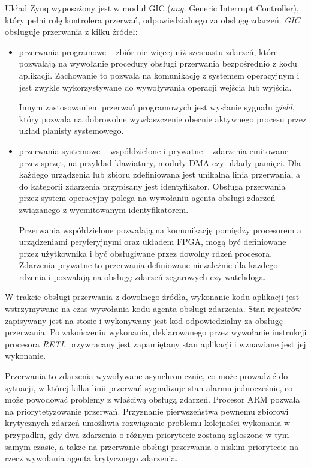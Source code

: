 Układ Zynq wyposażony jest w moduł GIC (\emph{ang.} Generic Interrupt Controller), który pełni rolę kontrolera przerwań, odpowiedzialnego za obsługę zdarzeń. \emph{GIC} obsługuje przerwania z kilku źródeł:
\begin{itemize}
	\item przerwania programowe -- zbiór nie więcej niż szesnastu zdarzeń, które pozwalają na wywołanie procedury obsługi przerwania bezpośrednio z kodu aplikacji. Zachowanie to pozwala na komunikację z systemem operacyjnym i jest zwykle wykorzystywane do wywoływania operacji wejścia lub wyjścia. 
	
	Innym zastosowaniem przerwań programowych jest wysłanie sygnału \emph{yield}, który pozwala na dobrowolne wywłaszczenie obecnie aktywnego procesu przez układ planisty systemowego.
	
	\item przerwania systemowe -- współdzielone i prywatne -- zdarzenia emitowane przez sprzęt, na przykład klawiatury, moduły DMA czy układy pamięci. Dla każdego urządzenia lub zbioru zdefiniowana jest unikalna linia przerwania, a do kategorii zdarzenia przypisany jest identyfikator. Obsługa przerwania przez system operacyjny polega na wywołaniu agenta obsługi zdarzeń związanego z wyemitowanym identyfikatorem.
	
	Przerwania współdzielone pozwalają na komunikację pomiędzy procesorem a urządzeniami peryferyjnymi oraz układem FPGA, mogą być definiowane przez użytkownika i być obsługiwane przez dowolny rdzeń procesora. Zdarzenia prywatne to przerwania definiowane niezależnie dla każdego rdzenia i pozwalają na obsługę zdarzeń zegarowych czy watchdoga.
\end{itemize}

W trakcie obsługi przerwania z dowolnego źródła, wykonanie kodu aplikacji jest wstrzymywane na czas wywołania kodu agenta obsługi zdarzenia. Stan rejestrów zapisywany jest na stosie i wykonywany jest kod odpowiedzialny za obsługę przerwania. Po zakończeniu wykonania, deklarowanego przez wywołanie instrukcji procesora \emph{RETI}, przywracany jest zapamiętany stan aplikacji i wznawiane jest jej wykonanie.

Przerwania to zdarzenia wywoływane asynchronicznie, co może prowadzić do sytuacji, w której kilka linii przerwań sygnalizuje stan alarmu jednocześnie, co może powodować problemy z właściwą obsługą zdarzeń. Procesor ARM pozwala na priorytetyzowanie przerwań. Przyznanie pierwszeństwa pewnemu zbiorowi krytycznych zdarzeń umożliwia rozwiązanie problemu kolejności wykonania w przypadku, gdy dwa zdarzenia o różnym priorytecie zostaną zgłoszone w tym samym czasie, a także na przerwanie obsługi przerwania o niskim priorytecie na rzecz wywołania agenta krytycznego zdarzenia.

